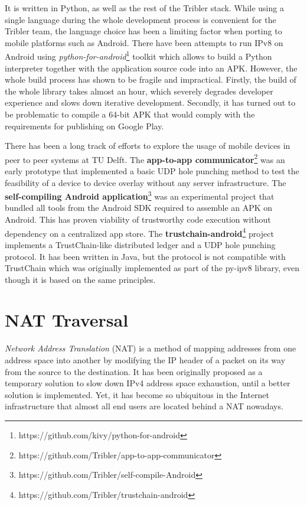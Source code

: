 It is written in Python, as well as the rest of the Tribler stack. While using a single language during the whole development process is convenient for the Tribler team, the language choice has been a limiting factor when porting to mobile platforms such as Android. There have been attempts to run IPv8 on Android using \textit{python-for-android}\footnote{https://github.com/kivy/python-for-android} toolkit which allows to build a Python interpreter together with the application source code into an APK. However, the whole build process has shown to be fragile and impractical. Firstly, the build of the whole library takes almost an hour, which severely degrades developer experience and slows down iterative development. Secondly, it has turned out to be problematic to compile a 64-bit APK that would comply with the requirements for publishing on Google Play.

There has been a long track of efforts to explore the usage of mobile devices in peer to peer systems at TU Delft. The \textbf{app-to-app communicator}\footnote{https://github.com/Tribler/app-to-app-communicator} was an early prototype that implemented a basic UDP hole punching method to test the feasibility of a device to device overlay without any server infrastructure. The \textbf{self-compiling Android application}\footnote{https://github.com/Tribler/self-compile-Android} was an experimental project that bundled all tools from the Android SDK required to assemble an APK on Android. This has proven viability of trustworthy code execution without dependency on a centralized app store. The \textbf{trustchain-android}\footnote{https://github.com/Tribler/trustchain-android} project implements a TrustChain-like distributed ledger and a UDP hole punching protocol. It has been written in Java, but the protocol is not compatible with TrustChain which was originally implemented as part of the py-ipv8 library, even though it is based on the same principles. %

\section{NAT Traversal}

\textit{Network Address Translation} (NAT) is a method of mapping addresses from one address space into another by modifying the IP header of a packet on its way from the source to the destination. It has been originally proposed as a temporary solution to slow down IPv4 address space exhaustion, until a better solution is implemented. \cite{nat} Yet, it has become so ubiquitous in the Internet infrastructure that almost all end users are located behind a NAT nowadays.

